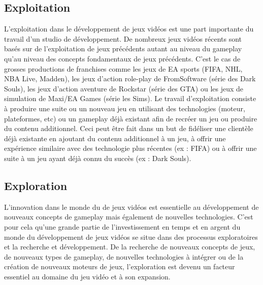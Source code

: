 \subsection{Exploitation}
L'exploitation dans le développement de jeux vidéos est une part importante du travail d'un studio de développement. De nombreux jeux vidéos récents sont basés sur de l'exploitation de jeux précédents autant au niveau du gameplay qu'au niveau des concepts fondamentaux de jeux précédents. C'est le cas de grosses productions de franchises comme les jeux de EA sports (FIFA, NHL, NBA Live, Madden), les jeux d'action role-play de FromSoftware (série des Dark Souls), les jeux d'action aventure de Rockstar (série des GTA) ou les jeux de simulation de Maxi/EA Games (série les Sims). Le travail d'exploitation consiste à produire une suite ou un nouveau jeu en utilisant des technologies (moteur, plateformes, etc) ou un gameplay déjà existant afin de recréer un jeu ou produire du contenu additionnel. Ceci peut être fait dans un but de fidéliser une clientèle déjà existante en ajoutant du contenu additionnel à un jeu, à offrir une expérience similaire avec des technologie plus récentes (ex : FIFA) ou à offrir une suite à un jeu ayant déjà connu du succès (ex : Dark Souls).

\subsection{Exploration}
L'innovation dans le monde du de jeux vidéos est essentielle au développement de nouveaux concepts de gameplay mais également de nouvelles technologies. C'est pour cela qu'une grande partie de l'investissement en temps et en argent du monde du développement de jeux vidéos se situe dans des processus exploratoires et la recherche et développement. De la recherche de nouveaux concepts de jeux, de nouveaux types de gameplay, de nouvelles technologies à intégrer ou de la création de nouveaux moteurs de jeux, l'exploration est devenu un facteur essentiel au domaine du jeu vidéo et à son expansion.

